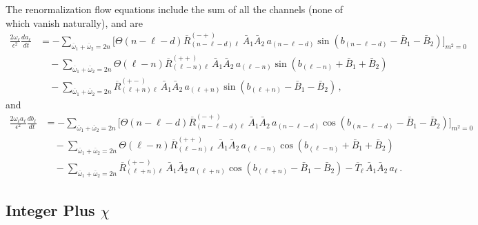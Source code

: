 \documentclass[letterpaper,11pt]{article}
\newcommand{\ol}{\omega_\ell}
\newcommand{\oone}{\overline{\omega}_1}
\newcommand{\otwo}{\overline{\omega}_2}
\begin{document}
The renormalization flow equations include the sum of all the channels (none of which vanish naturally), and are
\begin{align}
\frac{2 \ol}{\epsilon^2} \frac{d a_\ell}{d t} &= - \!\!\!\! \sum_{\oone + \otwo = 2n}\bigg[ \Theta\left( n - \ell - d \right) \overline{R}^{(-+)}_{(n - \ell - d) \ell} \ \bar A_1 \bar A_2 \, a_{(n - \ell - d)} \sin \left( b_{(n - \ell - d)} - \bar B_1 - \bar B_2 \right) \bigg]_{m^2 = 0}  \nonumber \\ 
%
& \quad - \!\!\!\! \sum_{\oone + \otwo = 2n} \!\!\!\! \Theta \left( \ell - n \right)  \overline{R}^{(++)}_{(\ell - n)\ell} \, \bar A_1 \bar A_2 \, a_{(\ell - n)} \sin \left( b_{(\ell - n)} + \bar B_1 + \bar B_2 \right) \nonumber \\
%
& \quad  - \!\!\!\! \sum_{\oone + \otwo = 2n} \!\!\!\! \overline{R}^{(+-)}_{(\ell + n) \ell} \, \bar A_1 \bar A_2 \, a_{(\ell + n)} \sin \left( b_{(\ell + n)} - \bar B_1 - \bar B_2 \right) \, ,
\end{align}
and
\begin{align}
\frac{2 \ol a_\ell}{\epsilon^2} \frac{d b_\ell}{d t} &= - \!\!\!\! \sum_{\oone + \otwo = 2n}\bigg[ \Theta\left( n - \ell - d \right) \overline{R}^{(-+)}_{(n - \ell - d) \ell} \ \bar A_1 \bar A_2 \, a_{(n - \ell - d)} \cos \left( b_{(n - \ell - d)} - \bar B_1 - \bar B_2 \right) \bigg]_{m^2 = 0}  \nonumber \\ 
%
& \quad - \!\!\!\! \sum_{\oone + \otwo = 2n} \!\!\!\! \Theta \left( \ell - n \right)  \overline{R}^{(++)}_{(\ell - n)\ell} \, \bar A_1 \bar A_2 \, a_{(\ell - n)} \cos \left( b_{(\ell - n)} + \bar B_1 + \bar B_2 \right) \nonumber \\
%
& \quad  - \!\!\!\! \sum_{\oone + \otwo = 2n} \!\!\!\! \overline{R}^{(+-)}_{(\ell + n) \ell} \, \bar A_1 \bar A_2 \, a_{(\ell + n)} \cos \left( b_{(\ell + n)} - \bar B_1 - \bar B_2 \right) - \overline{T}_{\ell} \, \bar A_1 \bar A_2 \, a_\ell \, .
\end{align}

\subsection{Integer Plus $\chi$}
\label{ssec: intpluschi}
\end{document}
